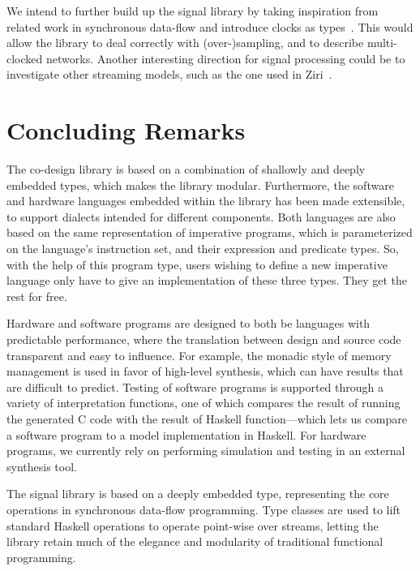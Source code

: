 We intend to further build up the signal library by taking inspiration from related work in synchronous data-flow and introduce clocks as types~\cite{lucy2008}. This would allow the library to deal correctly with (over-)sampling, and to describe multi-clocked networks. Another interesting direction for signal processing could be to investigate other streaming models, such as the one used in Ziri~\cite{ziria2015, fudgets1993}.

\section{Concluding Remarks}
\label{conc}

The co-design library is based on a combination of shallowly and deeply embedded types, which makes the library modular. Furthermore, the software and hardware languages embedded within the library has been made extensible, to support dialects intended for different components. Both languages are also based on the same representation of imperative programs, which is parameterized on the language's instruction set, and their expression and predicate types. So, with the help of this program type, users wishing to define a new imperative language only have to give an implementation of these three types. They get the rest for free.

Hardware and software programs are designed to both be languages with predictable performance, where the translation between design and source code transparent and easy to influence. For example, the monadic style of memory management is used in favor of high-level synthesis, which can have results that are difficult to predict. Testing of software programs is supported through a variety of interpretation functions, one of which compares the result of running the generated C code with the result of Haskell function---which lets us compare a software program to a model implementation in Haskell. For hardware programs, we currently rely on performing simulation and testing in an external synthesis tool.

The signal library is based on a deeply embedded type, representing the core operations in synchronous data-flow programming. Type classes are used to lift standard Haskell operations to operate point-wise over streams, letting the library retain much of the elegance and modularity of traditional functional programming.

